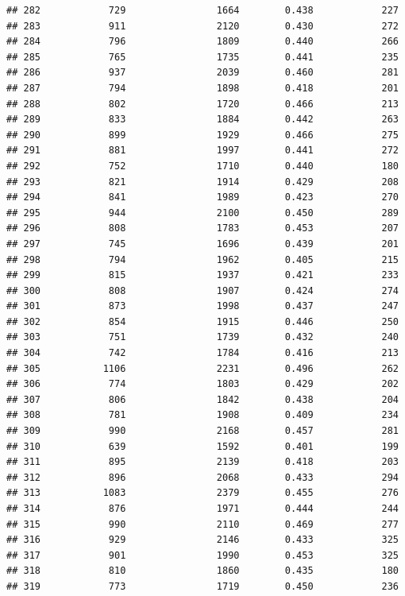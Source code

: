 \documentclass[]{book}
\begin{document}
\begin{verbatim}
## 282            729                1664        0.438            227
## 283            911                2120        0.430            272
## 284            796                1809        0.440            266
## 285            765                1735        0.441            235
## 286            937                2039        0.460            281
## 287            794                1898        0.418            201
## 288            802                1720        0.466            213
## 289            833                1884        0.442            263
## 290            899                1929        0.466            275
## 291            881                1997        0.441            272
## 292            752                1710        0.440            180
## 293            821                1914        0.429            208
## 294            841                1989        0.423            270
## 295            944                2100        0.450            289
## 296            808                1783        0.453            207
## 297            745                1696        0.439            201
## 298            794                1962        0.405            215
## 299            815                1937        0.421            233
## 300            808                1907        0.424            274
## 301            873                1998        0.437            247
## 302            854                1915        0.446            250
## 303            751                1739        0.432            240
## 304            742                1784        0.416            213
## 305           1106                2231        0.496            262
## 306            774                1803        0.429            202
## 307            806                1842        0.438            204
## 308            781                1908        0.409            234
## 309            990                2168        0.457            281
## 310            639                1592        0.401            199
## 311            895                2139        0.418            203
## 312            896                2068        0.433            294
## 313           1083                2379        0.455            276
## 314            876                1971        0.444            244
## 315            990                2110        0.469            277
## 316            929                2146        0.433            325
## 317            901                1990        0.453            325
## 318            810                1860        0.435            180
## 319            773                1719        0.450            236

\end{verbatim}
\end{document}
